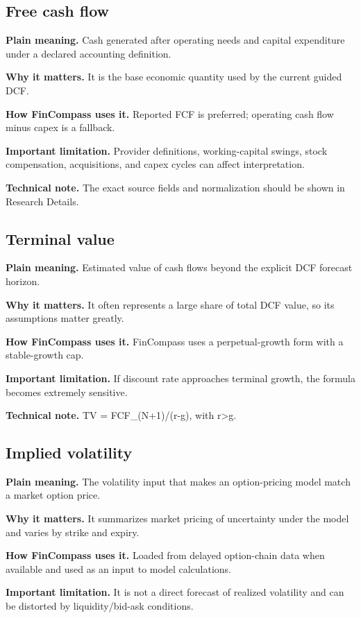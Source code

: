 \documentclass[11pt]{article}
\begin{document}
\subsection{Free cash flow}
\textbf{Plain meaning.} Cash generated after operating needs and capital expenditure under a declared accounting definition.

\textbf{Why it matters.} It is the base economic quantity used by the current guided DCF.

\textbf{How FinCompass uses it.} Reported FCF is preferred; operating cash flow minus capex is a fallback.

\textbf{Important limitation.} Provider definitions, working-capital swings, stock compensation, acquisitions, and capex cycles can affect interpretation.

\textbf{Technical note.} The exact source fields and normalization should be shown in Research Details.

\subsection{Terminal value}
\textbf{Plain meaning.} Estimated value of cash flows beyond the explicit DCF forecast horizon.

\textbf{Why it matters.} It often represents a large share of total DCF value, so its assumptions matter greatly.

\textbf{How FinCompass uses it.} FinCompass uses a perpetual-growth form with a stable-growth cap.

\textbf{Important limitation.} If discount rate approaches terminal growth, the formula becomes extremely sensitive.

\textbf{Technical note.} TV = FCF\_(N+1)/(r-g), with r>g.

\subsection{Implied volatility}
\textbf{Plain meaning.} The volatility input that makes an option-pricing model match a market option price.

\textbf{Why it matters.} It summarizes market pricing of uncertainty under the model and varies by strike and expiry.

\textbf{How FinCompass uses it.} Loaded from delayed option-chain data when available and used as an input to model calculations.

\textbf{Important limitation.} It is not a direct forecast of realized volatility and can be distorted by liquidity/bid-ask conditions.
\end{document}
